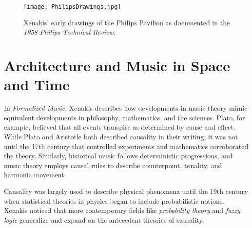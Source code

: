 \begin{figure*}[h]
  \texttt{[image: PhilipsDrawings.jpg]}
  \caption{Xenakis' early drawings of the Philips Pavilion as
    documented in the \textit{1958 Philips Technical Review}.}
  \label{fig:xenakis-draw}
\end{figure*}

\section{Architecture and Music in Space and Time}
\label{sec:introduction-conclusion}

In \textit{Formalized Music}, Xenakis describes how developments in
music theory mimic equivalent developments in philosophy, mathematics,
and the sciences. Plato, for example, believed that all events
transpire as determined by cause and effect. While Plato and
Aristotle both described causality in their writing, it was not until
the 17th century that controlled experiments and mathematics
corroborated the theory.  Similarly, historical music
follows deterministic progressions, and music theory employs causal
rules to describe counterpoint, tonality, and harmonic movement.

Causality was largely used to describe physical phenomena until the
19th century when statistical theories in physics began to include
probabilistic notions. Xenakis
noticed that more contemporary fields like \emph{probability theory}
and \emph{fuzzy logic} generalize and expand on the antecedent
theories of causality.

